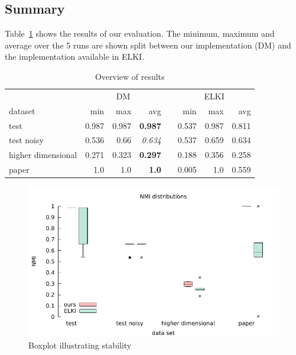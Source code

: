 \documentclass[english]{scrartcl}
\begin{document}
\vfill

\subsection{Summary}

Table~\ref{tab:overview} shows the results of our evaluation. The minimum,
maximum and average over the 5 runs are shown split between our implementation
(DM) and the implementation available in ELKI.

\begin{table}[bt]\centering
  \begin{tabular}{lrrrcrrr}\toprule
     & \multicolumn{3}{c}{DM} & \phantom{abc} & \multicolumn{3}{c}{ELKI}\\
    dataset & min & max & avg & & min & max & avg\\ \midrule
    test & 0.987 & 0.987 & \textbf{0.987} & & 0.537 & 0.987 & 0.811\\
    test noisy & 0.536 & 0.66 & \emph{0.634} & & 0.537 & 0.659 & 0.634\\
    higher dimensional & 0.271 & 0.323 & \textbf{0.297} & & 0.188 & 0.356 & 0.258\\
    paper & 1.0 & 1.0 & \textbf{1.0} & & 0.005 & 1.0 & 0.559\\
  \bottomrule
  \end{tabular}
  \caption{Overview of results}
  \label{tab:overview}
\end{table}

\begin{figure}[t]
    \centering
    \includegraphics[width=\textwidth]{img/boxplt}
    \caption{Boxplot illustrating stability}
    \label{fig:box}
\end{figure}
\end{document}
